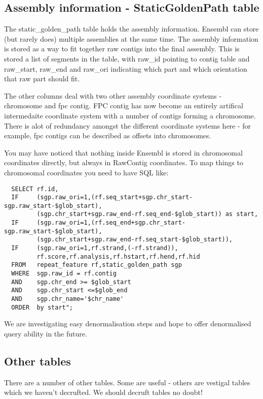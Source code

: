 \documentclass[11pt,a4paper]{article}
\begin{document}
\subsection{Assembly information - StaticGoldenPath table}

The static\_golden\_path table holds the assembly information. Ensembl
can store (but rarely does) multiple assemblies at the same time. The
assembly information is stored as a way to fit together raw contigs
into the final assembly. This is stored a list of segments in the
table, with raw\_id pointing to contig table and raw\_start, raw\_end
and raw\_ori indicating which part and which orientation that raw part
should fit.

The other columns deal with two other assembly coordinate systems -
chromosome and fpc contig. FPC contig has now become an entirely
artifical intermedaite coordinate system with a number of contigs
forming a chromosome. There is alot of redundancy amongst the
different coordinate systems here - for example, fpc contigs can be
described as offsets into chromosomes.

You may have noticed that nothing inside Ensembl is stored in
chromosomal coordinates directly, but always in RawContig coordinates.
To map things to chromosomal coordinates you need to have SQL like:

\begin{verbatim}
  SELECT rf.id,
  IF     (sgp.raw_ori=1,(rf.seq_start+sgp.chr_start-sgp.raw_start-$glob_start),
         (sgp.chr_start+sgp.raw_end-rf.seq_end-$glob_start)) as start,                                        
  IF     (sgp.raw_ori=1,(rf.seq_end+sgp.chr_start-sgp.raw_start-$glob_start),
         (sgp.chr_start+sgp.raw_end-rf.seq_start-$glob_start)), 
  IF     (sgp.raw_ori=1,rf.strand,(-rf.strand)),                         
         rf.score,rf.analysis,rf.hstart,rf.hend,rf.hid  
  FROM   repeat_feature rf,static_golden_path sgp
  WHERE  sgp.raw_id = rf.contig
  AND    sgp.chr_end >= $glob_start 
  AND    sgp.chr_start <=$glob_end
  AND    sgp.chr_name='$chr_name' 
  ORDER  by start";
\end{verbatim}

We are investigating easy denormalisation steps and hope to offer denormalised
query ability in the future.

\subsection{Other tables}

There are a number of other tables. Some are useful - others are vestigal tables
which we haven't decrufted. We should decruft tables no doubt!
\end{document}
